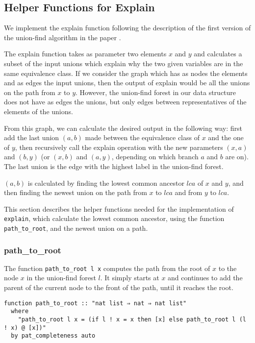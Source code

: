 \subsection{Helper Functions for Explain}

We implement the explain function following the description of the first version of the union-find algorithm in the paper \cite{Nieuwenhuis}.

The explain function takes as parameter two elements $x$ and $y$ and calculates a subset of the input unions which explain why the two given variables are in the same equivalence class. If we consider the graph which has as nodes the elements and as edges the input unions, then the output of explain would be all the unions on the path from $x$ to $y$. However, the union-find forest in our data structure does not have as edges the unions, but only edges between representatives of the elements of the unions.

From this graph, we can calculate the desired output in the following way: first add the last union $(a, b)$ made between the equivalence class of $x$ and the one of $y$, then recursively call the explain operation with the new parameters $(x, a)$ and $(b, y)$ (or $(x, b)$ and $(a, y)$, depending on which branch $a$ and $b$ are on). The last union is the edge with the highest label in the union-find forest.

$(a, b)$ is calculated by finding the lowest common ancestor $lca$ of $x$ and $y$, and then finding the newest union on the path from $x$ to $lca$ and from $y$ to $lca$.

This section describes the helper functions needed for the implementation of \lstinline|explain|, which calculate the lowest common ancestor, using the function \lstinline{path_to_root}, and the newest union on a path.

\subsubsection{path\_to\_root}
\label{subsubsection:path-to-root}

The function \lstinline{path_to_root l x} computes the path from the root of $x$ to the node $x$ in the union-find forest $l$. It simply starts at $x$ and continues to add the parent of the current node to the front of the path, until it reaches the root.

\begin{lstlisting}
function path_to_root :: "nat list ⇒ nat ⇒ nat list"
  where
    "path_to_root l x = (if l ! x = x then [x] else path_to_root l (l ! x) @ [x])"
  by pat_completeness auto
\end{lstlisting}

